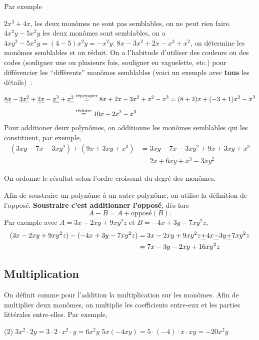\documentclass[a4paper,12pt]{report}
\begin{document}
Par exemple
\begin{tasks}
	\task $2x^3+4x$, les deux monômes ne sont pas semblables, on ne peut rien faire.
	\task $4x^2y-5x^2y$ les deux monômes sont semblables, on a $4xy^2-5x^2y=(4-5)x^2y=-x^2y$. 
	\task $8x-3x^2+2x-x^3+x^2$, on détermine les monômes semblables et on réduit. On a l'habitude d'utiliser des couleurs ou des codes (souligner une ou plusieurs fois, souligner en vaguelette, etc.) pour différencier les \enquote{différents} monômes semblables (voici un exemple avec {\bfseries tous} les détails)~: 
\end{tasks}
\begin{align*}
	\uwave{8x}-\uline{3x^2}+\uwave{2x}-\uuline{x^3}+\uline{x^2}&\stackrel{\text{regrouper}}{=}8x+2x-3x^2+x^2-x^3=(8+2)x+(-3+1)x^2-x^3\\
&\stackrel{\text{réduire}}{=}10x-2x^2-x^3
\end{align*}
Pour additioner deux polynômes, on additionne les monômes semblables qui les constituent, par exemple,
\begin{align*}
	(3xy-7x-3xy^2)+(9x+3xy+x^3)&=3xy-7x-3xy^2+9x+3xy+x^3\\
				   &=2x+6xy+x^3-3xy^2
\end{align*}
\begin{rem}
	On ordonne le résultat selon l'ordre croissant du degré des monômes.
\end{rem}
Afin de soustraire un polynôme à un autre polynôme, on utilise la définition de l'opposé. {\bfseries Soustraire c'est additionner l'opposé}, dès lors
\[A-B=A+\text{opposé}(B).\]
Par exemple avec $A=3x-2xy+9xy^2z$ et $B=-4x+3y-7xy^2z$, 
\begin{align*}
	(3x-2xy+9xy^2z)-(-4x+3y-7xy^2z)&=3x-2xy+9xy^2z\uline{+}4x\uline{-}3y\uline{+}7xy^2z\\
&=7x-3y-2xy+16xy^2z
\end{align*}
\subsection{Multiplication}
On définit comme pour l'addition la multiplication sur les monômes. Afin de multiplier deux monômes, on multiplie les coefficients entre-eux et les parties littérales entre-elles. 
Par exemple, 
\begin{tasks}(2)
	\task $3x^2\cdot 2y=3\cdot 2\cdot x^2\cdot y=6x^2y$
	\task $5x(-4xy)=5\cdot (-4)\cdot x\cdot xy=-20x^2y$
\end{tasks}
\end{document}
